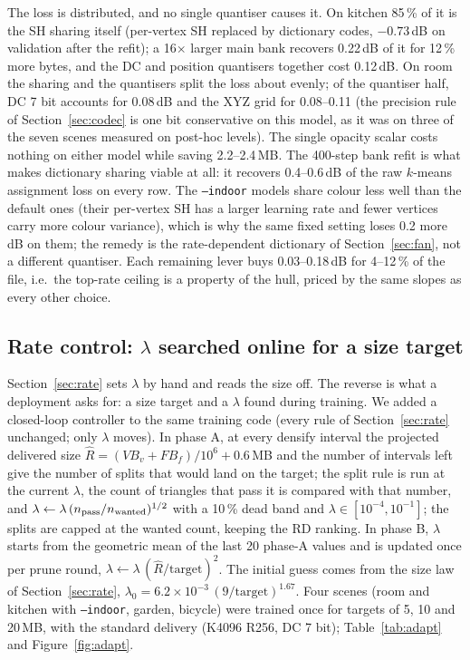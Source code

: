 \documentclass[11pt,a4paper]{article}
\begin{document}
The loss is distributed, and no single quantiser causes it. On kitchen 85\,\% of it is the SH sharing itself (per-vertex SH replaced by dictionary codes, $-0.73$\,dB on validation after the refit); a 16$\times$ larger main bank recovers 0.22\,dB of it for 12\,\% more bytes, and the DC and position quantisers together cost 0.12\,dB. On room the sharing and the quantisers split the loss about evenly; of the quantiser half, DC 7 bit accounts for 0.08\,dB and the XYZ grid for 0.08--0.11 (the precision rule of Section~\ref{sec:codec} is one bit conservative on this model, as it was on three of the seven scenes measured on post-hoc levels). The single opacity scalar costs nothing on either model while saving 2.2--2.4\,MB. The 400-step bank refit is what makes dictionary sharing viable at all: it recovers 0.4--0.6\,dB of the raw $k$-means assignment loss on every row. The \texttt{--indoor} models share colour less well than the default ones (their per-vertex SH has a larger learning rate and fewer vertices carry more colour variance), which is why the same fixed setting loses 0.2 more dB on them; the remedy is the rate-dependent dictionary of Section~\ref{sec:fan}, not a different quantiser. Each remaining lever buys 0.03--0.18\,dB for 4--12\,\% of the file, i.e.\ the top-rate ceiling is a property of the hull, priced by the same slopes as every other choice.


\subsection{Rate control: $\lambda$ searched online for a size target}
\label{sec:adapt}

Section~\ref{sec:rate} sets $\lambda$ by hand and reads the size off. The reverse is what a deployment asks for: a size target and a $\lambda$ found during training. We added a closed-loop controller to the same training code (every rule of Section~\ref{sec:rate} unchanged; only $\lambda$ moves). In phase A, at every densify interval the projected delivered size $\hat R = (V B_v + F B_f)/10^6 + 0.6$\,MB and the number of intervals left give the number of splits that would land on the target; the split rule is run at the current $\lambda$, the count of triangles that pass it is compared with that number, and $\lambda \leftarrow \lambda\,(n_{\rm pass}/n_{\rm wanted})^{1/2}$ with a 10\,\% dead band and $\lambda \in [10^{-4}, 10^{-1}]$; the splits are capped at the wanted count, keeping the RD ranking. In phase B, $\lambda$ starts from the geometric mean of the last 20 phase-A values and is updated once per prune round, $\lambda \leftarrow \lambda\,(\hat R/\text{target})^2$. The initial guess comes from the size law of Section~\ref{sec:rate}, $\lambda_0 = 6.2\times10^{-3}\,(9/\text{target})^{1.67}$. Four scenes (room and kitchen with \texttt{--indoor}, garden, bicycle) were trained once for targets of 5, 10 and 20\,MB, with the standard delivery (K4096 R256, DC 7 bit); Table~\ref{tab:adapt} and Figure~\ref{fig:adapt}.
\end{document}
